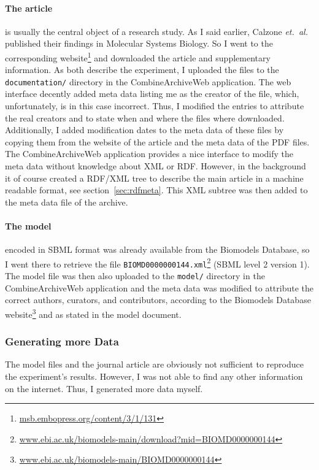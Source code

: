 \paragraph{The article} is usually the central object of a research study. As I said earlier, Calzone \emph{et.~al.} published their findings in Molecular Systems Biology. So I went to the corresponding website\footnote{\href{http://msb.embopress.org/content/3/1/131}{msb.embopress.org/content/3/1/131}} and downloaded the article and supplementary information.
As both describe the experiment, I uploaded the files to the \texttt{documentation/} directory in the CombineArchiveWeb application.
The web interface decently added meta data listing me as the creator of the file, which, unfortunately, is in this case incorrect.
Thus, I modified the entries to attribute the real creators and to state when and where the files where downloaded.
Additionally, I added modification dates to the meta data of these files by copying them from the website of the article and the meta data of the PDF files.
The CombineArchiveWeb application provides a nice interface to modify the meta data without knowledge about XML or RDF.
However, in the background it of course created a RDF/XML tree to describe the main article in a machine readable format, see section~\ref{sec:rdfmeta}.
This XML subtree was then added to the meta data file of the archive.


\paragraph{The model} encoded in SBML format was already available from the Biomodels Database, so I went there to retrieve the file \texttt{BIOMD0000000144.xml}\footnote{\href{http://www.ebi.ac.uk/biomodels-main/download?mid=BIOMD0000000144}{www.ebi.ac.uk/biomodels-main/download?mid=BIOMD0000000144}} (SBML level 2 version 1).
The model file was then also uploaded to the \texttt{model/} directory in the CombineArchiveWeb application and the meta data was modified to attribute the correct authors, curators, and contributors, according to the Biomodels Database website\footnote{\href{http://www.ebi.ac.uk/biomodels-main/BIOMD0000000144}{www.ebi.ac.uk/biomodels-main/BIOMD0000000144}} and as stated in the model document.


\subsubsection{Generating more Data}
The model files and the journal article are obviously not sufficient to reproduce the experiment's results.
However, I was not able to find any other information on the internet.
Thus, I generated more data myself.

